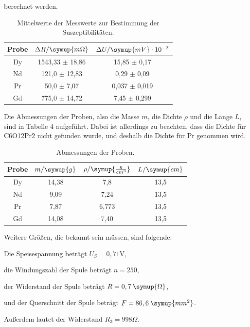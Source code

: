 berechnet werden.
\begin{table}[H]
  \centering
  \caption{Mittelwerte der Messwerte zur Bestimmung der Suszeptibilitäten.}
  \label{tab:Widerstand}
  \begin{tabular}{c c c}
    \toprule
    Probe  &  $\Delta R / \symup{m\Omega}$ & $\Delta U / \symup{mV}\cdot 10^{-2}$  \\
    \midrule
    Dy & 1543,33 $\pm$ 18,86 & 15,85 $\pm$ 0,17 \\
    Nd & 121,0 $\pm$ 12,83 & 0,29 $\pm$ 0,09\\
    Pr & 50,0 $\pm$ 7,07 & 0,037 $\pm$ 0,019 \\
    Gd & 775,0 $\pm$ 14,72 & 7,45 $\pm$ 0,299\\
    \bottomrule
  \end{tabular}
\end{table}

Die Abmessungen der Proben, also die Masse $m$, die Dichte $\rho$ und die Länge $L$, sind in Tabelle 4 aufgeführt. Dabei ist allerdings zu beachten, dass die Dichte für C6O12Pr2 nicht gefunden wurde, und deshalb die Dichte für Pr genommen wird.
\begin{table}[H]
  \centering
  \caption{Abmessungen der Proben.}
  \label{tab:Dy}
  \begin{tabular}{c c c c}
    \toprule
    Probe & $m/ \symup{g}$ & $\rho / \symup{\frac{g}{cm^3}}$   & $L / \symup{cm}$  \\
    \midrule
    Dy & 14,38 & 7,8 & 13,5\\
    Nd & 9,09 & 7,24 & 13,5\\
    Pr & 7,87 & 6,773 & 13,5 \\
    Gd & 14,08 & 7,40 & 13,5\\
    \bottomrule
  \end{tabular}
\end{table}

\noindent Weitere Größen, die bekannt sein müssen, sind folgende:

\noindent Die Speisespannung beträgt $U_S = 0,71\si{\volt}$,

\noindent die Windungszahl der Spule beträgt $n = 250$,

\noindent der Widerstand der Spule beträgt $R = 0,7 \: \symup{\Omega}$,

\noindent und der Querschnitt der Spule beträgt  $F = 86,6 \: \symup{mm^2}$.

\noindent Außerdem lautet der Widerstand $R_3 = 998 \Omega$.

